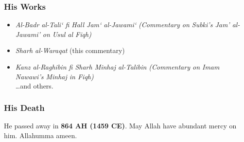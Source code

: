 \documentclass[
  a4paper,
  DIV=11,
  numbers=noendperiod]{scrartcl}
\providecommand{\tightlist}{%
  \setlength{\itemsep}{0pt}\setlength{\parskip}{0pt}}
\begin{document}
\subsubsection{His Works}\label{his-works-1}

\begin{itemize}
\tightlist
\item
  \emph{Al-Badr al-Tali` fi Hall Jam` al-Jawami` (Commentary on Subki's
  Jam' al-Jawami' on Usul al Fiqh)}\\
\item
  \emph{Sharh al-Waraqat} (this commentary)\\
\item
  \emph{Kanz al-Raghibin fi Sharh Minhaj al-Talibin (Commentary on Imam
  Nawawi's Minhaj in Fiqh)}\\
  \ldots and others.
\end{itemize}

\subsubsection{His Death}\label{his-death-1}

He passed away in \textbf{864 AH (1459 CE)}. May Allah have abundant
mercy on him. Allahumma ameen.
\end{document}

